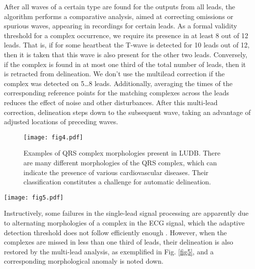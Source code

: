 \documentclass[submitted]{ieeeaccess}
\newcommand{\NewCorrection}[1]{{#1}}
\begin{document}
After all waves of a certain type are found for the outputs from all leads, the algorithm performs a comparative analysis, aimed at correcting omissions or spurious waves, appearing in recordings for certain leads. As a formal validity threshold for a complex occurrence, we require its presence in at least 8 out of 12 leads. That is, if for some heartbeat the T-wave is detected for 10 leads out of 12, then it is taken that this wave is also present for the other two leads. Conversely, if the complex is found in \NewCorrection{at most} one third of the total number of leads, then it is retracted from delineation. \NewCorrection{We don’t use the multilead correction if the complex was detected on 5\dots8 leads.} Additionally, averaging the times of the corresponding reference points for the matching complexes across the leads reduces the effect of noise and other disturbances. After this multi-lead correction, delineation steps down to the subsequent wave, taking an advantage of adjusted locations of preceding waves.


\begin{figure}
    \centering
	\texttt{[image: fig4.pdf]}
	\caption{{Examples of QRS complex morphologies present in LUDB.}
		There are many different morphologies of the QRS complex, which can indicate the presence of various cardiovascular diseases. Their classification constitutes a challenge for automatic delineation.}
	\label{fig4}
\end{figure}


\begin{figure*}
    \centering
	\texttt{[image: fig5.pdf]}
	
	\caption{{Multi-lead refinement of delineation.}
		Gray frames show the complexes, which fall short of the single lead analysis, but are recovered by the multi-lead refinement. \NewCorrection{For each missed complex the averaged value for the start and the averaged value for the end of the complex were found. The averaging is performed over those leads, where the complex is found. The global extremum in this interval (from the average start to the average end) is considered as the peak of the complex.}}
	\label{fig5}
\end{figure*}


Instructively, some failures in the single-lead signal processing are apparently due to alternating morphologies of a complex in the ECG signal, which the adaptive detection threshold does not follow efficiently enough \cite{Kalyakulina2018}. However, when the complexes are missed in less than one third of leads, their delineation is also restored by the multi-lead analysis, as exemplified in Fig. \ref{fig5}, and a corresponding morphological anomaly is noted down. 
\end{document}
